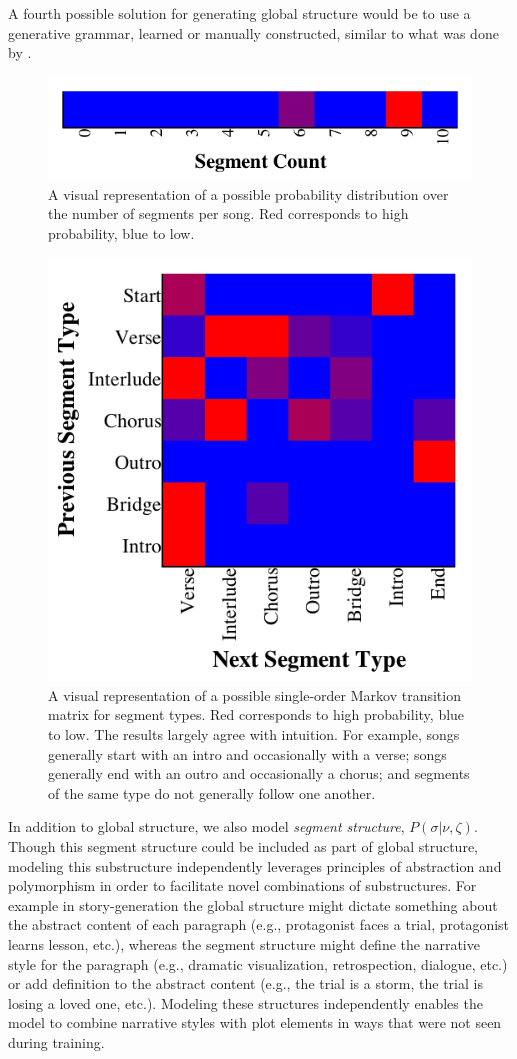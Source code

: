 \documentclass[letterpaper]{article}
\begin{document}
A fourth possible solution for generating global structure would be to use a generative grammar, learned or manually constructed, similar to what was done by \cite{steedman1984generative}.

\begin{figure}
	\centering
	\includegraphics[width=.8\linewidth]{segment_count_per_song}
	\caption{\label{fig:segment_count_per_song} A visual representation of a possible probability distribution over the number of segments per song. Red corresponds to high probability, blue to low.}
\end{figure}

\begin{figure}[t]
	\centering
	\includegraphics[width=.6\linewidth]{segment_transitions}
	\caption{\label{fig:segment_transitions} A visual representation of a possible single-order Markov transition matrix for segment types. Red corresponds to high probability, blue to low. The results largely agree with intuition. For example, songs generally start with an intro and occasionally with a verse; songs generally end with an outro and occasionally a chorus; and segments of the same type do not generally follow one another.}
\end{figure}

In addition to global structure, we also model \emph{segment structure}, $P(\sigma|\nu,\zeta)$. Though this segment structure could be included as part of global structure, modeling this substructure independently leverages principles of abstraction and polymorphism in order to facilitate novel combinations of substructures. For example in story-generation the global structure might dictate something about the abstract content of each paragraph (e.g., protagonist faces a trial, protagonist learns lesson, etc.), whereas the segment structure might define the narrative style for the paragraph (e.g., dramatic visualization, retrospection, dialogue, etc.) or add definition to the abstract content (e.g., the trial is a storm, the trial is losing a loved one, etc.). Modeling these structures independently enables the model to combine narrative styles with plot elements in ways that were not seen during training.
\end{document}
